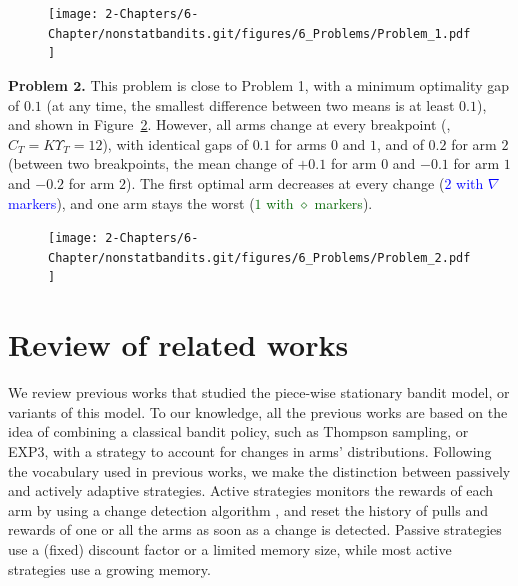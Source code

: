 \begin{figure}[h!]  %
    \centering
    \texttt{[image: 2-Chapters/6-Chapter/nonstatbandits.git/figures/6\_Problems/Problem\_1.pdf]}
    \label{fig:6:Problem_1}
\end{figure}


\textbf{Problem $\bm 2$.}
This problem is close to Problem 1, with a minimum optimality gap of $0.1$ (at any time, the smallest difference between two means is at least $0.1$),
and shown in Figure~\ref{fig:6:Problem_2}.
However, all arms change at every breakpoint (\ie, $C_T=K\Upsilon_T=12$), with identical gaps of $0.1$ for arms $0$ and $1$, and of $0.2$ for arm $2$ (between two breakpoints, the mean change of $+0.1$ for arm $0$ and $-0.1$ for arm $1$ and $-0.2$ for arm $2$).
The first optimal arm decreases at every change (\textcolor{blue}{$2$ with $\nabla$ markers}), and one arm stays the worst (\textcolor{darkgreen}{$1$ with $\diamond$ markers}).

\begin{figure}[h!]  %
    \centering
    \texttt{[image: 2-Chapters/6-Chapter/nonstatbandits.git/figures/6\_Problems/Problem\_2.pdf]}
    \label{fig:6:Problem_2}
\end{figure}


\section{Review of related works}
\label{sec:6:relatedWork}

We review previous works that studied the piece-wise stationary bandit model, or variants of this model.
To our knowledge, all the previous works are based on the idea of combining a classical bandit policy, such as Thompson sampling, \UCB{} or EXP3, with a strategy to account for changes in arms' distributions.
Following the vocabulary used in previous works, we make the distinction between passively and actively adaptive strategies.
Active strategies monitors the rewards of each arm by using a change detection algorithm \cite{Basseville93}, and reset the history of pulls and rewards of one or all the arms as soon as a change is detected.
Passive strategies use a (fixed) discount factor or a limited memory size, while most active strategies use a growing memory.


